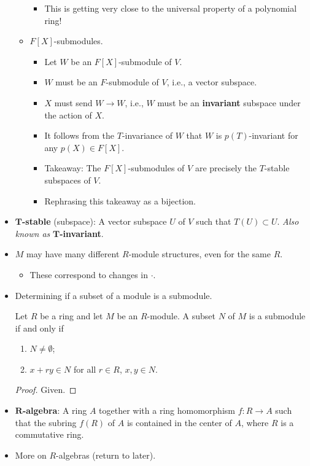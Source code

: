 \documentclass[../notes.tex]{subfiles}
\begin{document}
\begin{itemize}
\begin{itemize}
\begin{itemize}
            \item This is getting very close to the universal property of a polynomial ring!
        \end{itemize}
        \item $F[X]$-submodules.
        \begin{itemize}
            \item Let $W$ be an $F[X]$-submodule of $V$.
            \item $W$ must be an $F$-submodule of $V$, i.e., a vector subspace.
            \item $X$ must send $W\to W$, i.e., $W$ must be an \textbf{invariant} subspace under the action of $X$.
            \item It follows from the $T$-invariance of $W$ that $W$ is $p(T)$-invariant for any $p(X)\in F[X]$.
            \item Takeaway: The $F[X]$-submodules of $V$ are precisely the $T$-stable subspaces of $V$.
            \item Rephrasing this takeaway as a bijection.
        \end{itemize}
    \end{itemize}
    \item \textbf{$\bm{T}$-stable} (subspace): A vector subspace $U$ of $V$ such that $T(U)\subset U$. \emph{Also known as} \textbf{$\bm{T}$-invariant}.
    \item {}$M$ may have many different $R$-module structures, even for the same $R$.
    \begin{itemize}
        \item These correspond to changes in $\cdot$.
    \end{itemize}
    \item Determining if a subset of a module is a submodule.
    \begin{proposition}\label{prp:10.1}
        Let $R$ be a ring and let $M$ be an $R$-module. A subset $N$ of $M$ is a submodule if and only if
        \begin{enumerate}
            \item $N\neq\emptyset$;
            \item $x+ry\in N$ for all $r\in R$, $x,y\in N$.
        \end{enumerate}
        \begin{proof}
            Given.
        \end{proof}
    \end{proposition}
    \item \textbf{$\bm{R}$-algebra}: A ring $A$ together with a ring homomorphism $f:R\to A$ such that the subring $f(R)$ of $A$ is contained in the center of $A$, where $R$ is a commutative ring.
    \item More on $R$-algebras (return to later).
\end{itemize}
\end{document}
